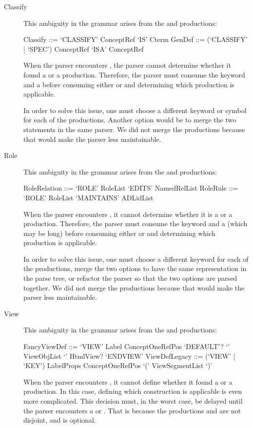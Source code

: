 \begin{description}
  \item[Classify]
    This ambiguity in the grammar arises from the  and  productions:
    \begin{ebnf}
     Classify ::= `CLASSIFY' ConceptRef `IS' Cterm
     GenDef ::= (`CLASSIFY' | `SPEC') ConceptRef `ISA' ConceptRef\end{ebnf}
    When the parser encounters , the parser cannot determine whether it found a  or a  production.
    Therefore, the parser must consume the keyword and a  before consuming either  or  and determining which production is applicable.
    
    In order to solve this issue, one must choose a different keyword or symbol for each of the productions.
    Another option would be to merge the two statements in the same parser.
    We did not merge the productions because that would make the parser less maintainable.
  
  \item[Role]
    This ambiguity in the grammar arises from the  and  productions:
    \begin{ebnf}
     RoleRelation ::= `ROLE' RoleList `EDITS' NamedRelList
     RoleRule ::= `ROLE' RoleList `MAINTAINS' ADLidList\end{ebnf}
    When the parser encounters , it cannot determine whether it is a  or a  production.
    Therefore, the parser must consume the keyword and a  (which may be long) before consuming either  or  and determining which production is applicable.
    
    In order to solve this issue, one must choose a different keyword for each of the productions, merge the two options to have the same representation in the parse tree, or refactor the parser so that the two options are parsed together.
    We did not merge the productions because that would make the parser less maintainable.
  
  \item[View]
    This ambiguity in the grammar arises from the  and  productions:
    \begin{ebnf}
     FancyViewDef ::= `VIEW' Label ConceptOneRefPos `DEFAULT'? `{' ViewObjList `}' HtmlView? `ENDVIEW'
     ViewDefLegacy ::= (`VIEW' | `KEY') LabelProps ConceptOneRefPos `(' ViewSegmentList `)'\end{ebnf}
    When the parser encounters , it cannot define whether it found a  or a  production.
    In this case, defining which construction is applicable is even more complicated.
    This decision must, in the worst case, be delayed until the parser encounters a  or .
    That is because the productions  and  are not disjoint, and  is optional.
    

\end{description}
